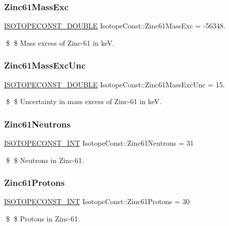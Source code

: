 \subsubsection{\texorpdfstring{Zinc61\+Mass\+Exc}{Zinc61MassExc}}
{\footnotesize\ttfamily \mbox{\hyperlink{group___isotope_const-_macros_ga8f45a7272ce02c0b4c65c44636ed719a}{I\+S\+O\+T\+O\+P\+E\+C\+O\+N\+S\+T\+\_\+\+D\+O\+U\+B\+LE}} Isotope\+Const\+::\+Zinc61\+Mass\+Exc = -\/56348.}

\$ \$ Mass excess of Zinc-\/61 in keV. \mbox{\label{group___isotope_const-_zinc-_zn61_ga0f292e3fe7c2052b62edeb46b7dbd272}} 
\subsubsection{\texorpdfstring{Zinc61\+Mass\+Exc\+Unc}{Zinc61MassExcUnc}}
{\footnotesize\ttfamily \mbox{\hyperlink{group___isotope_const-_macros_ga8f45a7272ce02c0b4c65c44636ed719a}{I\+S\+O\+T\+O\+P\+E\+C\+O\+N\+S\+T\+\_\+\+D\+O\+U\+B\+LE}} Isotope\+Const\+::\+Zinc61\+Mass\+Exc\+Unc = 15.}

\$ \$ Uncertainty in mass excess of Zinc-\/61 in keV. \mbox{\label{group___isotope_const-_zinc-_zn61_ga1f35ee0759244301df32a64ff3adbfd5}} 
\subsubsection{\texorpdfstring{Zinc61\+Neutrons}{Zinc61Neutrons}}
{\footnotesize\ttfamily \mbox{\hyperlink{group___isotope_const-_macros_ga5f18360b3e99483a35c32d789e62621c}{I\+S\+O\+T\+O\+P\+E\+C\+O\+N\+S\+T\+\_\+\+I\+NT}} Isotope\+Const\+::\+Zinc61\+Neutrons = 31}

\$ \$ Neutrons in Zinc-\/61. \mbox{\label{group___isotope_const-_zinc-_zn61_ga0958446b02d6368a52b66846c40da0b3}} 
\subsubsection{\texorpdfstring{Zinc61\+Protons}{Zinc61Protons}}
{\footnotesize\ttfamily \mbox{\hyperlink{group___isotope_const-_macros_ga5f18360b3e99483a35c32d789e62621c}{I\+S\+O\+T\+O\+P\+E\+C\+O\+N\+S\+T\+\_\+\+I\+NT}} Isotope\+Const\+::\+Zinc61\+Protons = 30}

\$ \$ Protons in Zinc-\/61. 